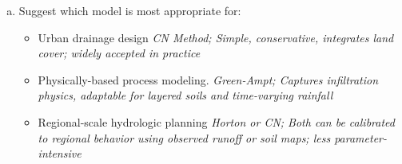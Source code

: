 \documentclass[12pt]{article}
\begin{document}
\begin{enumerate}
\begin{enumerate}[a)]
        \item Suggest which model is most appropriate for:
            \begin{itemize}
                \item Urban drainage design \textsl{CN Method; Simple, conservative, integrates land cover; widely accepted in practice}
                \item Physically-based process modeling. \textsl{Green-Ampt; Captures infiltration physics, adaptable for layered soils and time-varying rainfall}
                \item Regional-scale hydrologic planning \textsl{Horton or CN; Both can be calibrated to regional behavior using observed runoff or soil maps; less parameter-intensive}
            \end{itemize}
    \end{enumerate}
    
\end{enumerate}
\end{document}
